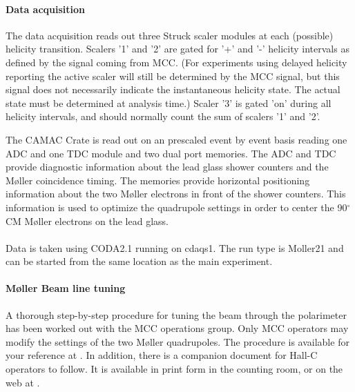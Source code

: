 %
\paragraph{Data acquisition}
The data acquisition reads out three Struck scaler modules at each
(possible) helicity transition. Scalers '1' and '2' are gated for '+'
and '-' helicity intervals as defined by the signal coming from
MCC. (For experiments using delayed helicity reporting the active
scaler will still be determined by the MCC signal, but this signal
does not necessarily indicate the instantaneous helicity state. The
actual state must be determined at analysis time.) Scaler '3' is gated
'on' during all helicity intervals, and should normally count the sum
of scalers '1' and '2'.

The CAMAC Crate is read out
on an prescaled event by event basis reading one ADC and one TDC
module and two dual port memories. The ADC and TDC provide diagnostic
information about the lead glass shower counters and the
M\o ller coincidence timing. The memories provide horizontal 
positioning information about the two M\o ller electrons in front
of the shower counters. This information is used to optimize
the quadrupole settings in order to center the 90$^{\circ}$ CM
M\o ller electrons on the lead glass. \\ \\
Data is taken using CODA2.1 running on cdaqs1. The run type
is Moller21 and can be started from the same location as the
main experiment.

\paragraph{M\o ller Beam line tuning}

A thorough step-by-step procedure for tuning the beam through the
polarimeter has been worked out with the MCC operations group. Only
MCC operators may modify the settings of the two M\o ller quadrupoles.
The procedure is available for your reference at
. In addition, there is a companion 
document for Hall-C operators to follow. It is available in print form in
the counting room, or on the web at 
.

